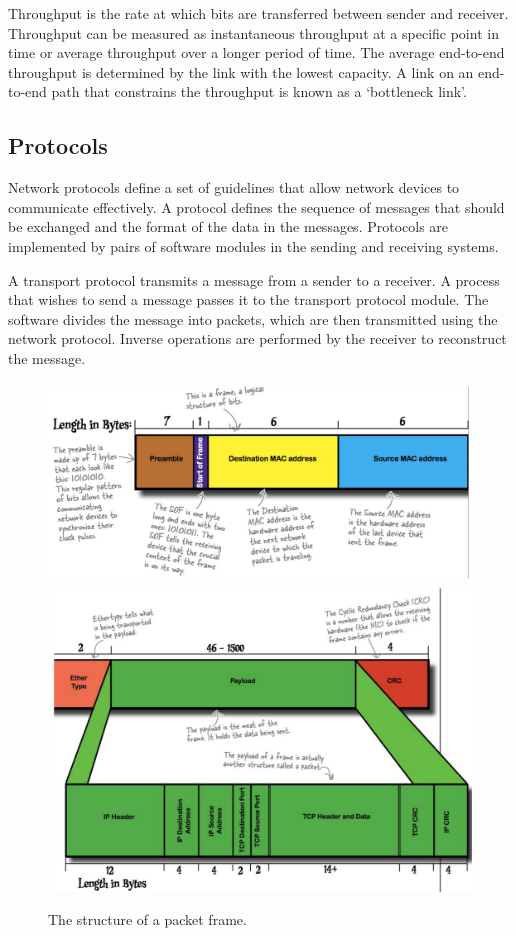 Throughput is the rate at which bits are transferred between sender and receiver.
Throughput can be measured as instantaneous throughput at a specific point in time or average throughput over a longer period of time.
The average end-to-end throughput is determined by the link with the lowest capacity.
A link on an end-to-end path that constrains the throughput is known as a `bottleneck link'.

\subsection{Protocols}

Network protocols define a set of guidelines that allow network devices to communicate effectively.
A protocol defines the sequence of messages that should be exchanged and the format of the data in the messages.
Protocols are implemented by pairs of software modules in the sending and receiving systems.

A transport protocol transmits a message from a sender to a receiver.
A process that wishes to send a message passes it to the transport protocol module.
The software divides the message into packets, which are then transmitted using the network protocol.
Inverse operations are performed by the receiver to reconstruct the message.

\begin{figure}[htp]
  \centering
  \includegraphics[width=15cm]{unit-16/figures/frame-part-1.png}
  \includegraphics[width=15cm]{unit-16/figures/frame-part-2.png}
  \caption*{The structure of a packet frame.}
\end{figure}

